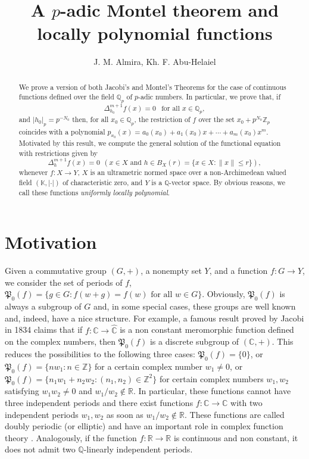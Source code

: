 \documentclass[12pt,a4paper]{amsart}
\author{J. M. Almira, Kh. F. Abu-Helaiel}
\title{A  $p$-adic Montel theorem and locally polynomial functions}
\theoremstyle{definition}
\begin{document}
\keywords{}

\subjclass[2010]{}

\begin{abstract} 
We prove a version of both Jacobi's and Montel's Theorems for the case of continuous functions defined over the field $\mathbb{Q}_p$ of $p$-adic numbers. In particular, we prove that, if 
\[
\Delta_{h_0}^{m+1}f(x)=0 \ \ \text{ for all } x\in\mathbb{Q}_p,
\]
and $|h_0|_p=p^{-N_0}$ then,  for all $x_0\in \mathbb{Q}_p$, the restriction of $f$  over the set $x_0+p^{N_0}\mathbb{Z}_p$  coincides with a  polynomial $p_{x_0}(x)=a_0(x_0)+a_1(x_0)x+\cdots+a_m(x_0)x^m$. Motivated by this result, we compute the general solution of the functional equation with restrictions given by 
\begin{equation*}
\Delta_h^{m+1}f(x)=0 \ \ (x\in X \text{ and } h\in B_X(r)=\{x\in X:\|x\|\leq r\}),
\end{equation*}
whenever $f:X\to Y$, $X$ is an ultrametric normed  space over a non-Archimedean valued field $(\mathbb{K},|\cdot|)$ of characteristic zero, and $Y$ is a $\mathbb{Q}$-vector space. By obvious reasons, we call these functions \textit{uniformly locally polynomial}. 

 \end{abstract}

\maketitle


\section{Motivation}
Given a commutative group $(G,+)$, a nonempty set $Y$, and a function $f:G\to Y$, we consider the set of periods of $f$, $\mathfrak{P}_0(f)=\{g\in G:f(w+g)=f(w)\text{ for all } w\in G\}$. Obviously, $\mathfrak{P}_0(f)$ is always a subgroup of $G$ and, in some special cases, these groups are well known and, indeed, have a nice structure.  For example, a famous result proved by Jacobi in 1834 claims that  if $f:\mathbb{C}\to\widehat{\mathbb{C}}$ is a non constant meromorphic function defined on the complex numbers, then  $\mathfrak{P}_0(f)$ is a discrete subgroup of $(\mathbb{C},+)$. This reduces the possibilities to the following three cases: $\mathfrak{P}_0(f)=\{0\}$, or $\mathfrak{P}_0(f)=\{nw_1:n\in\mathbb{Z}\}$ for a certain complex number $w_1\neq 0$, or $\mathfrak{P}_0(f)=\{n_1w_1+n_2w_2:(n_1,n_2)\in \mathbb{Z}^2\}$ for certain complex numbers $w_1,w_2$ satisfying $w_1w_2\neq 0$ and $w_1/w_2\not\in\mathbb{R}$. In particular, these functions cannot have three independent periods and there exist functions  $f:\mathbb{C}\to\mathbb{C}$  with two independent periods $w_1,w_2$ as soon as $w_1/w_2\not\in\mathbb{R}$. These functions are called doubly periodic (or elliptic) and have an important role in complex function theory \cite{JS}.  Analogously, if the function $f:\mathbb{R}\to\mathbb{R}$ is continuous and non constant, it does not admit  two $\mathbb{Q}$-linearly independent periods. 
\end{document}
